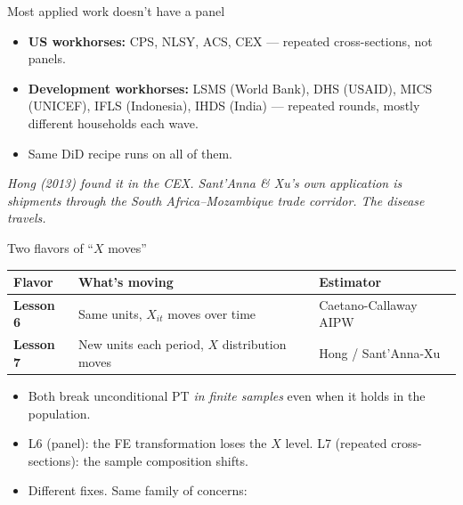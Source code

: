 \documentclass[aspectratio=169,11pt]{beamer}
\begin{document}
\begin{frame}{Most applied work doesn't have a panel}
\vspace{0.6em}
\vspace{0.8em}
\begin{itemize}
  \item \textbf{US workhorses:} CPS, NLSY, ACS, CEX --- repeated cross-sections, not panels.
  \item \textbf{Development workhorses:} LSMS (World Bank), DHS (USAID), MICS (UNICEF), IFLS (Indonesia), IHDS (India) --- repeated rounds, mostly different households each wave.
  \item Same DiD recipe runs on all of them. 
\end{itemize}
\vspace{0.6em}
\begin{center}
\small\color{warmgray}\itshape
Hong (2013) found it in the CEX. \;Sant'Anna \& Xu's own application is shipments through the South Africa--Mozambique trade corridor. \;The disease travels.
\end{center}
\end{frame}

\begin{frame}{Two flavors of ``$X$ moves''}
\vspace{0.4em}
\begin{center}
\renewcommand{\arraystretch}{1.4}
\footnotesize
\begin{tabular}{@{}lll@{}}
\toprule
\textbf{Flavor} & \textbf{What's moving} & \textbf{Estimator} \\
\midrule
\textbf{Lesson 6} & Same units, $X_{it}$ moves over time & Caetano-Callaway AIPW \\[0.1em]
\textbf{Lesson 7} & New units each period, $X$ distribution moves & Hong / Sant'Anna-Xu \\
\bottomrule
\end{tabular}
\end{center}
\vspace{0.6em}
\begin{itemize}\small
  \item Both break unconditional PT \textit{in finite samples} even when it holds in the population.
  \item L6 (panel): the FE transformation loses the $X$ level. \;\; L7 (repeated cross-sections): the sample composition shifts.
  \item Different fixes. Same family of concerns: 
\end{itemize}
\end{frame}
\end{document}
